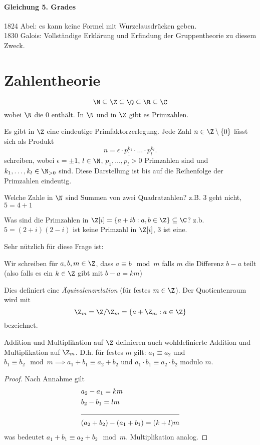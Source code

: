 \paragraph{Gleichung 5. Grades}
1824 Abel: es kann keine Formel mit Wurzelausdrücken geben.\\
1830 Galois: Vollständige Erklärung und Erfindung der Gruppentheorie zu diesem Zweck.

\section{Zahlentheorie}
\[
\N \subseteq \Z \subseteq \Q \subseteq \R \subseteq \C
\] 
wobei $\N$ die $0$ enthält. In $\N$ und in $\Z$ gibt es Primzahlen.
\begin{theorem}
	Es gibt in $\Z$ eine eindeutige Primfaktorzerlegung.
	Jede Zahl $n \in \Z \setminus \{0\}$ lässt sich als Produkt
	\[
	n = \epsilon \cdot p_1^{k_1} \cdot \ldots \cdot p_{l}^{k_{l}}
	.\] 
	schreiben, wobei $\epsilon = \pm 1$, $l \in \N$, $p_1,\ldots,p_{l} > 0$ Primzahlen sind und $k_1,\ldots,k_{l} \in \N_{> 0}$ sind.
	Diese Darstellung ist bis auf die Reihenfolge der Primzahlen eindeutig.
\end{theorem}

Welche Zahle in $\N$ sind Summen von zwei Quadratzahlen?
z.B. $3$ geht nicht, $5 = 4+1$

Was sind die Primzahlen in $\Z[i] = \{a + ib: a,b \in \Z\} \subseteq \C$?
z.b. $5 = (2+i)(2-i)$ ist keine Primzahl in $\Z[i]$, $3$ ist eine.

Sehr nützlich für diese Frage ist:
\begin{definition}
	Wir schreiben für $a,b,m \in \Z$, dass $a \equiv b \mod m$ falls $m$ die Differenz $b-a$ teilt (also falls es ein  $k \in \Z$ gibt mit $b-a = k m $)
\end{definition}

Dies definiert eine \emph{Äquivalenzrelation} (für festes $m \in \Z$).
Der Quotientenraum wird mit 
\[
	\Z_{m} = \Z / \Z_{m} = \{a + \Z_{m}: a \in \Z\} 
\]
bezeichnet.

\begin{lemma}
	Addition und Multiplikation auf $\Z$ definieren auch wohldefinierte Addition und Multiplikation auf $\Z_{m}$.
	D.h. für festes $m$ gilt: $a_1 \equiv a_2$ und $b_1 \equiv b_2 \mod m \implies a_1 + b_1 \equiv a_2 + b_2$ und $a_1 \cdot b_1 \equiv a_2 \cdot b_2$ modulo $m$.
\end{lemma}

\begin{proof}
	Nach Annahme gilt
	\begin{align*}
		&a_2 - a_1 = km\\
		&b_2 - b_1 = lm\\
		\cline{1-2}
		&(a_2+b_2) - (a_1+b_1) = (k+l)m
	\end{align*}
	was bedeutet $a_1 + b_1 \equiv a_2 + b_2 \mod m$.
	Multiplikation analog.
\end{proof}

